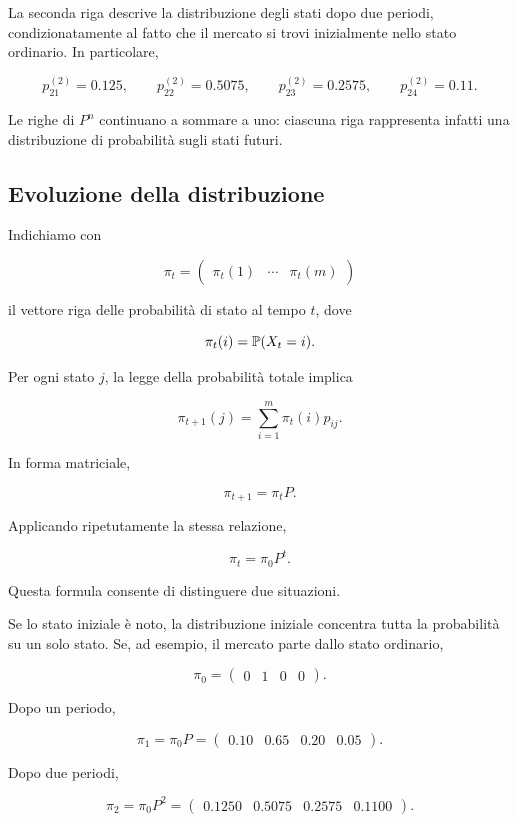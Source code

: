 La seconda riga descrive la distribuzione degli stati dopo due periodi,
condizionatamente al fatto che il mercato si trovi inizialmente nello
stato ordinario. In particolare,

\[
p_{21}^{(2)}=0.125,
\qquad
p_{22}^{(2)}=0.5075,
\qquad
p_{23}^{(2)}=0.2575,
\qquad
p_{24}^{(2)}=0.11.
\]

Le righe di \(P^n\) continuano a sommare a uno: ciascuna riga
rappresenta infatti una distribuzione di probabilit\`{a} sugli stati
futuri.

\subsection{Evoluzione della distribuzione}

Indichiamo con

\[
\pi_t
=
\begin{pmatrix}
\pi_t(1) & \cdots & \pi_t(m)
\end{pmatrix}
\]

il vettore riga delle probabilit\`{a} di stato al tempo \(t\), dove

\[
\pi_t(i)=\mathbb{P}(X_t=i).
\]

Per ogni stato \(j\), la legge della probabilit\`{a} totale implica

\[
\pi_{t+1}(j)
=
\sum_{i=1}^{m}
\pi_t(i)p_{ij}.
\]

In forma matriciale,

\[
\pi_{t+1}=\pi_tP.
\]

Applicando ripetutamente la stessa relazione,

\[
\pi_t=\pi_0P^t.
\]

Questa formula consente di distinguere due situazioni.

Se lo stato iniziale \`{e} noto, la distribuzione iniziale concentra
tutta la probabilit\`{a} su un solo stato. Se, ad esempio, il mercato
parte dallo stato ordinario,

\[
\pi_0
=
\begin{pmatrix}
0 & 1 & 0 & 0
\end{pmatrix}.
\]

Dopo un periodo,

\[
\pi_1
=
\pi_0P
=
\begin{pmatrix}
0.10 & 0.65 & 0.20 & 0.05
\end{pmatrix}.
\]

Dopo due periodi,

\[
\pi_2
=
\pi_0P^2
=
\begin{pmatrix}
0.1250 & 0.5075 & 0.2575 & 0.1100
\end{pmatrix}.
\]


